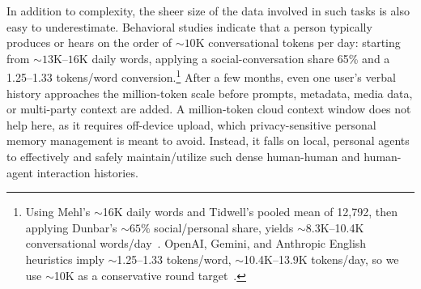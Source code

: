 In addition to complexity, the sheer size of the data involved in such tasks is also easy to underestimate. 
Behavioral studies indicate that a person typically produces or hears on the order of ${\sim}10$K conversational tokens per day: starting from ${\sim}13$K--$16$K daily words, applying a social-conversation share 65\% and a 1.25--1.33 tokens/word conversion.\footnote{Using Mehl's ${\sim}$16K daily words and Tidwell's pooled mean of 12{,}792, then applying Dunbar's ${\sim}65\%$ social/personal share, yields ${\sim}$8.3K--10.4K conversational words/day~\citep{mehl2007women,tidwell2025talkative,dunbar1997gossip}. OpenAI, Gemini, and Anthropic English heuristics imply ${\sim}$1.25--1.33 tokens/word, \ie{} ${\sim}$10.4K--13.9K tokens/day, so we use ${\sim}$10K as a conservative round target~\citep{openai2026tokens,google2025geminitokens,anthropic2023claude2modelcard}.} After a few months, even one user's verbal history approaches the million-token scale before prompts, metadata, media data, or multi-party context are added. 
A million-token cloud context window does not help here, as it requires off-device upload, which privacy-sensitive personal memory management is meant to avoid. 
Instead, it falls on local, personal agents to effectively and safely maintain/utilize such dense human-human and human-agent interaction histories.


